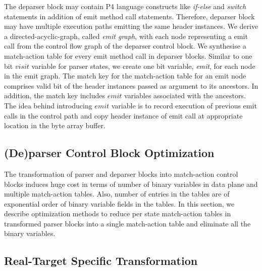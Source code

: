 \documentclass{hotnets19}
\begin{document}
The deparser block may contain P4 language constructs like \emph{if-else} and \emph{switch} statements in addition of emit method call statements.
Therefore, deparser block may have multiple execution paths emitting the same header instances. 
We derive a directed-acyclic-graph, called \emph{emit graph}, with each node representing a emit call from the control flow graph of the deparser control block.
We synthesise a match-action table for every emit method call in deparser blocks.
Similar to one bit $visit$ variable for parser states, we create one bit variable, \emph{emit}, for each node in the emit graph.
The match key for the match-action table for an emit node comprises valid bit of the header instances passed as argument to its ancestors.
In addition, the match key includes $emit$ variables associated with the ancestors.
The idea behind introducing $emit$ variable is to record execution of previous emit calls in the control path and copy header instance  of emit call at appropriate location in the byte array buffer.



\subsection{(De)parser Control Block Optimization}
The transformation of parser and deparser blocks into match-action control blocks induces huge cost in terms of number of binary variables in data plane and multiple match-action tables.
Also, number of entries in the tables are of exponential order of binary variable fields in the tables.
In this section, we describe optimization methods to reduce per state match-action tables in transformed parser blocks into a single match-action table and eliminate all the binary variables.
 

\subsection{Real-Target Specific Transformation}
\end{document}
